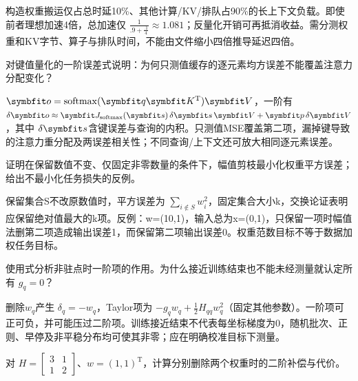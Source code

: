 \begin{exercises}
\begin{exercise}
\begin{solution}
构造权重搬运仅占总时延10\%、其他计算/KV/排队占90\%的长上下文负载。即使前者理想加速4倍，总加速仅 $\frac{1}{.9+\frac{.1}{4}}\approx1.081$；反量化开销可再抵消收益。需分测权重和KV字节、算子与排队时间，不能由文件缩小四倍推导延迟四倍。
\end{solution}
\end{exercise}

\begin{exercise} 对键值量化的一阶误差式说明：为何只测值缓存的逐元素均方误差不能覆盖注意力分配变化？

\begin{solution}
$\vect{o}=\mathrm{softmax}(\vect{q}\mat{K}^{\mathrm{T}})\mat{V}$，一阶有 $\delta \vect{o}\approx \mat{J}_{\mathrm{softmax}}(\vect{s})\,\delta \vect{s}\,\mat{V}+\vect{p}\,\delta \mat{V}$，其中 $\delta \vect{s}$含键误差与查询的内积。只测值MSE覆盖第二项，漏掉键导致的注意力重分配及两误差相关性；不同查询/上下文还可放大相同逐元素误差。
\end{solution}
\end{exercise}

\begin{exercise}\optional 证明在保留数值不变、仅固定非零数量的条件下，幅值剪枝最小化权重平方误差；给出不最小化任务损失的反例。

\begin{solution}
保留集合S不改原数值时，平方误差为 $\sum_{i\notin S}w_i^2$，固定集合大小k，交换论证表明应保留绝对值最大的k项。反例：w=(10,1)，输入总为x=(0,1)，只保留一项时幅值法删第二项造成输出误差1，而保留第二项输出误差0。权重范数目标不等于数据加权任务目标。
\end{solution}
\end{exercise}

\begin{exercise} 使用式分析非驻点时一阶项的作用。为什么接近训练结束也不能未经测量就认定所有 $g_q=0$？

\begin{solution}
删除$w_q$产生 $\delta_q=-w_q$，Taylor项为 $-g_qw_q+\frac12H_{qq}w_q^2$（固定其他参数）。一阶项可正可负，并可能压过二阶项。训练接近结束不代表每坐标梯度为0，随机批次、正则、早停及非平稳分布均可使其非零；应在明确校准目标下测量。
\end{solution}
\end{exercise}

\begin{exercise}\optional 对 $H=\begin{bmatrix}3&1\\1&2\end{bmatrix}$、$w=(1,1)^{\mathrm{T}}$，计算分别删除两个权重时的二阶补偿与代价。


\end{exercise}
\end{exercises}

